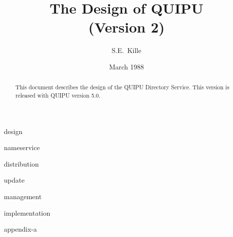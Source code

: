 








\title{\huge The Design of QUIPU \\
{\large (Version 2)}}
\author{S.E.~Kille}

\date {March 1988}

\maketitle

\begin {abstract}
This document describes the design of the QUIPU Directory Service.
This version is released with QUIPU version 5.0.
\end {abstract}



\thispagestyle{empty}
\setcounter{page}{0}
\mbox{}
\newpage

\tableofcontents


\listoffigures

\newpage
\ifodd\value{page} \else
    \mbox{}
    \newpage
\fi
{}



 {design}

 {nameservice}

 {distribution}

 {update}

 {management}

 {implementation}

\appendix 

 {appendix-a}






